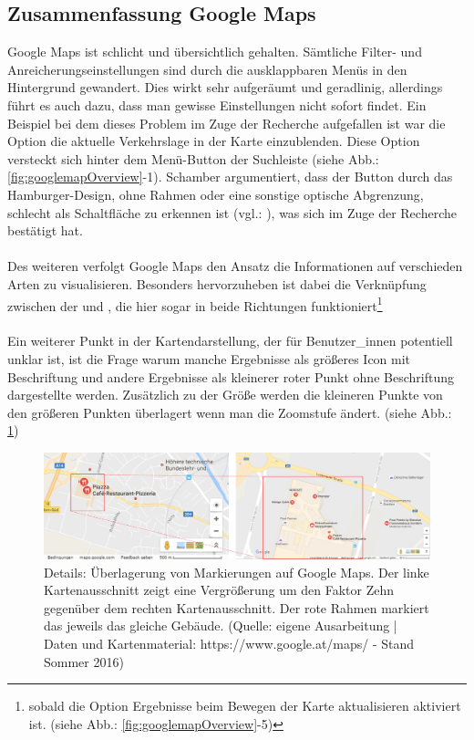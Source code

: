 \documentclass[../Bachelorarbeit.tex]{subfiles}
\begin{document}
\subsection{Zusammenfassung Google Maps}
Google Maps ist schlicht und übersichtlich gehalten.
Sämtliche Filter- und Anreicherungseinstellungen sind durch die ausklappbaren Menüs in den Hintergrund gewandert.
Dies wirkt sehr aufgeräumt und geradlinig, allerdings führt es auch dazu, dass man gewisse Einstellungen nicht sofort findet.
Ein Beispiel bei dem dieses Problem im Zuge der Recherche aufgefallen ist war die Option die aktuelle Verkehrslage in der Karte einzublenden.
Diese Option versteckt sich hinter dem Menü-Button der Suchleiste (siehe Abb.: \ref{fig:googlemapOverview}-1). 
Schamber argumentiert, dass der Button durch das Hamburger-Design, ohne Rahmen oder eine sonstige optische Abgrenzung, schlecht als Schaltfläche zu erkennen ist (vgl.: \cite{SchamberHamburgerIcon}), was sich im Zuge der Recherche bestätigt hat.\\
\\
Des weiteren verfolgt Google Maps den Ansatz die Informationen auf verschieden Arten zu visualisieren. 
Besonders hervorzuheben ist dabei die Verknüpfung zwischen der  und , die hier sogar in beide Richtungen funktioniert\footnote{sobald die Option Ergebnisse beim Bewegen der Karte aktualisieren aktiviert ist. (siehe Abb.: \ref{fig:googlemapOverview}-5)}\\
\\
Ein weiterer Punkt in der Kartendarstellung, der für Benutzer\_innen potentiell unklar ist, ist die Frage warum manche Ergebnisse als größeres Icon mit Beschriftung und andere Ergebnisse als kleinerer roter Punkt ohne Beschriftung dargestellte werden. 
Zusätzlich zu der Größe werden die kleineren Punkte von den größeren Punkten überlagert wenn man die Zoomstufe ändert. (siehe Abb.: \ref{fig:googlemapDetail})


\begin{figure}[H]
\centering
\includegraphics[width=1\linewidth]{img/StandDerTechnik/googlemapDetail}
\caption[Details: Überlagerung von Markierungen auf Google Maps]{Details: Überlagerung von Markierungen auf Google Maps. Der linke Kartenausschnitt zeigt eine Vergrößerung um den Faktor Zehn gegenüber dem rechten Kartenausschnitt. Der rote Rahmen markiert das jeweils das gleiche Gebäude. (Quelle: eigene Ausarbeitung | Daten und Kartenmaterial: https://www.google.at/maps/ - Stand Sommer 2016)}
\label{fig:googlemapDetail}
\end{figure}
\end{document}
